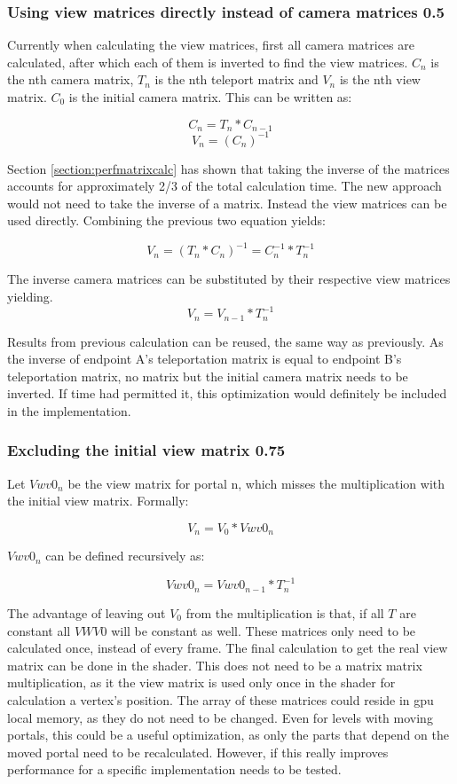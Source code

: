 \subsubsection{Using view matrices directly instead of camera matrices 0.5}
Currently when calculating the view matrices, first all camera matrices are calculated, after which each of them is inverted to find the view matrices. $C_n$ is the nth camera matrix, $T_n$ is the nth teleport matrix and $V_n$ is the nth view matrix. $C_0$ is the initial camera matrix. This can be written as:

$$C_n = T_{n} * C_{n-1}$$
$$V_n = (C_{n})^{-1}$$

Section \ref{section:perfmatrixcalc} has shown that taking the inverse of the matrices accounts for approximately 2/3 of the total calculation time. The new approach would not need to take the inverse of a matrix. Instead the view matrices can be used directly.
Combining the previous two equation yields:

$$V_n = (T_n * C_n)^{-1} = C_n^{-1} * T_n^{-1}$$

The inverse camera matrices can be substituted by their respective view matrices yielding.
$$V_n = V_{n-1} * T_n^{-1}$$

Results from previous calculation can be reused, the same way as previously. As the inverse of \gls{endpoint} A's teleportation matrix is equal to \gls{endpoint} B's teleportation matrix, no matrix but the initial camera matrix needs to be inverted. If time had permitted it, this optimization would definitely be included in the implementation.

\subsubsection{Excluding the initial view matrix 0.75}
\label{section:noveiw}
Let $Vwv0_n$ be the view matrix for portal n, which misses the multiplication with the initial view matrix. Formally:

$$V_n = V_0 * Vwv0_n$$

$Vwv0_n$ can be defined recursively as:

$$Vwv0_n = Vwv0_{n-1} * T_n^{-1}$$

The advantage of leaving out $V_0$ from the multiplication is that, if all $T$ are constant all $VWV0$ will be constant as well. These matrices only need to be calculated once, instead of every frame. The final calculation to get the real view matrix can be done in the shader. This does not need to be a matrix matrix multiplication, as it the view matrix is used only once in the shader for calculation a vertex's position. The array of these matrices could reside in \gls{gpu} local memory, as they do not need to be changed. Even for levels with moving portals, this could be a useful optimization, as only the parts that depend on the moved portal need to be recalculated. However, if this really improves performance for a specific implementation needs to be tested.

